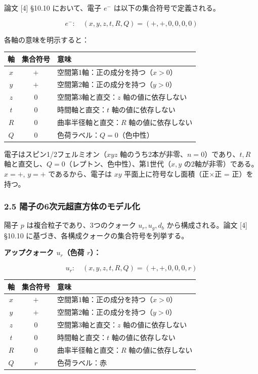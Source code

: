 \documentclass[
  a4paper,11pt]{ltjsarticle}
\newcounter{none}
\theoremstyle{definition}
\theoremstyle{remark}
\begin{document}
論文 {[}4{]} §10.10 において、電子 \(e^-\)
は以下の集合符号で定義される。

\[e^-: \quad (x, y, z, t, R, Q) = (+, +, 0, 0, 0, 0)\]

各軸の意味を明示すると：

{\def\LTcaptype{none} %
\begin{longtable}[]{@{}ccl@{}}
\toprule\noalign{}
軸 & 集合符号 & 意味 \\
\midrule\noalign{}
\endhead
\bottomrule\noalign{}
\endlastfoot
\(x\) & \(+\) & 空間第1軸：正の成分を持つ（\(x > 0\)） \\
\(y\) & \(+\) & 空間第2軸：正の成分を持つ（\(y > 0\)） \\
\(z\) & \(0\) & 空間第3軸と直交：\(z\) 軸の値に依存しない \\
\(t\) & \(0\) & 時間軸と直交：\(t\) 軸の値に依存しない \\
\(R\) & \(0\) & 曲率半径軸と直交：\(R\) 軸の値に依存しない \\
\(Q\) & \(0\) & 色荷ラベル：\(Q = 0\)（色中性） \\
\end{longtable}
}

電子はスピン1/2フェルミオン（\(xyz\)
軸のうち2本が非零、\(n = 0\)）であり、\(t, R\)
軸と直交し、\(Q = 0\)（レプトン、色中性）、第1世代（\(x, y\)
の2軸が非零）である。\(x = +\), \(y = +\) であるから、電子は \(xy\)
平面上に符号なし面積（正×正 = 正）を持つ。

\subsubsection{2.5
陽子の6次元超直方体のモデル化}\label{ux967dux5b50ux306e6ux6b21ux5143ux8d85ux76f4ux65b9ux4f53ux306eux30e2ux30c7ux30ebux5316}

陽子 \(p\) は複合粒子であり、3つのクォーク \(u_r, u_g, d_b\)
から構成される。論文 {[}4{]} §10.10
に基づき、各構成クォークの集合符号を列挙する。

\textbf{アップクォーク \(u_r\)（色荷 \(r\)）：}

\[u_r: \quad (x, y, z, t, R, Q) = (+, +, 0, 0, 0, r)\]

{\def\LTcaptype{none} %
\begin{longtable}[]{@{}ccl@{}}
\toprule\noalign{}
軸 & 集合符号 & 意味 \\
\midrule\noalign{}
\endhead
\bottomrule\noalign{}
\endlastfoot
\(x\) & \(+\) & 空間第1軸：正の成分を持つ（\(x > 0\)） \\
\(y\) & \(+\) & 空間第2軸：正の成分を持つ（\(y > 0\)） \\
\(z\) & \(0\) & 空間第3軸と直交：\(z\) 軸の値に依存しない \\
\(t\) & \(0\) & 時間軸と直交：\(t\) 軸の値に依存しない \\
\(R\) & \(0\) & 曲率半径軸と直交：\(R\) 軸の値に依存しない \\
\(Q\) & \(r\) & 色荷ラベル：赤 \\
\end{longtable}
}
\end{document}
